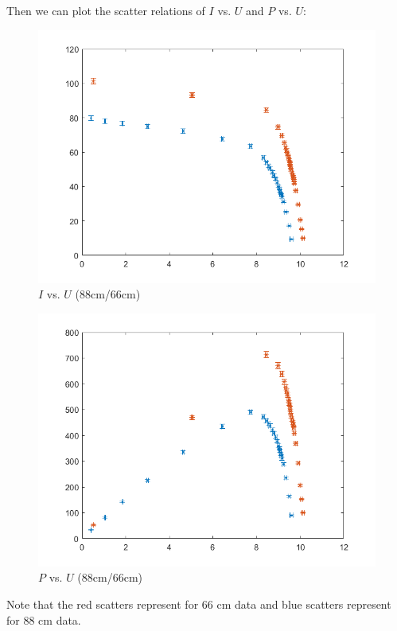 \documentclass[12pt, a4paper]{article}
\begin{document}
Then we can plot the scatter relations of $I$ vs. $U$ and $P$ vs. $U$:
\begin{figure}[H]
	\centering
	\includegraphics[scale = 0.6]{plot3.png}
	\caption{$I$ vs. $U$ (88cm/66cm)}
\end{figure}

\begin{figure}[H]
	\centering
	\includegraphics[scale = 0.6]{plot4.png}
	\caption{$P$ vs. $U$ (88cm/66cm)}	
\end{figure}

Note that the red scatters represent for 66 cm data and blue scatters represent for 88 cm data.
\end{document}
